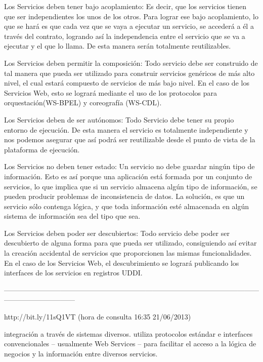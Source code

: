     Los Servicios deben tener bajo acoplamiento: Es decir, que los servicios tienen que ser independientes los unos de los otros. Para 
    lograr ese bajo acoplamiento, lo que se hará es que cada vez que se vaya a ejecutar un servicio, se accederá a él a través del contrato, 
    logrando así la independencia entre el servicio que se va a ejecutar y el que lo llama. De esta manera serán totalmente reutilizables.

    Los Servicios deben permitir la composición: Todo servicio debe ser construido de tal manera que pueda ser utilizado para construir 
    servicios genéricos de más alto nivel, el cual estará compuesto de servicios de más bajo nivel. En el caso de los Servicios Web, esto 
    se logrará mediante el uso de los protocolos para orquestación(WS-BPEL) y coreografía (WS-CDL).

    Los Servicios deben de ser autónomos: Todo Servicio debe tener su propio entorno de ejecución. De esta manera el servicio es totalmente 
    independiente y nos podemos asegurar que así podrá ser reutilizable desde el punto de vista de la plataforma de ejecución.

    Los Servicios no deben tener estado: Un servicio no debe guardar ningún tipo de información. Esto es así porque una aplicación está 
    formada por un conjunto de servicios, lo que implica que si un servicio almacena algún tipo de información, se pueden producir 
    problemas de inconsistencia de datos. La solución, es que un servicio sólo contenga lógica, y que toda información esté almacenada 
    en algún sistema de información sea del tipo que sea.

    Los Servicios deben poder ser descubiertos: Todo servicio debe poder ser descubierto de alguna forma para que pueda ser utilizado, 
    consiguiendo así evitar la creación accidental de servicios que proporcionen las mismas funcionalidades. En el caso de los Servicios 
    Web, el descubrimiento se logrará publicando los interfaces de los servicios en registros UDDI.
    
------------------------------------------------------------------------------------------------------------------------------------------

http://bit.ly/11sQ1VT (hora de consulta 16:35 21/06/2013)

integración a través de sistemas diversos.
utiliza protocolos estándar e interfaces convencionales – usualmente Web Services – para facilitar el acceso a la lógica de negocios 
y la información entre diversos servicios.

